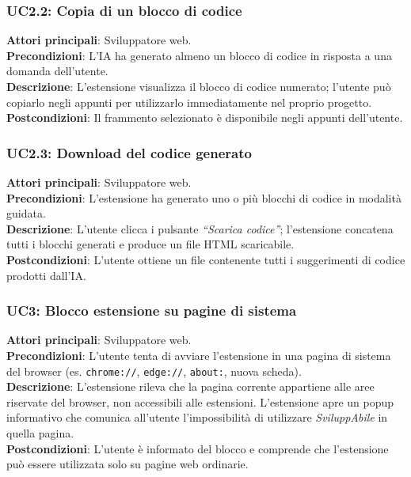 \subsubsection*{UC2.2: Copia di un blocco di codice}
\noindent \textbf{Attori principali}: Sviluppatore web.\\
\textbf{Precondizioni}: L’IA ha generato almeno un blocco di codice in risposta a una domanda dell’utente.\\
\textbf{Descrizione}: L’estensione visualizza il blocco di codice numerato; l’utente può copiarlo negli appunti per utilizzarlo immediatamente nel proprio progetto.\\
\textbf{Postcondizioni}: Il frammento selezionato è disponibile negli appunti dell’utente.\\

\subsubsection*{UC2.3: Download del codice generato}
\noindent \textbf{Attori principali}: Sviluppatore web.\\
\textbf{Precondizioni}: L’estensione ha generato uno o più blocchi di codice in modalità guidata.\\
\textbf{Descrizione}: L’utente clicca i pulsante \textit{“Scarica codice”}; l’estensione concatena tutti i blocchi generati e produce un file HTML scaricabile.\\
\textbf{Postcondizioni}: L’utente ottiene un file contenente tutti i suggerimenti di codice prodotti dall’IA.\\

\subsubsection*{UC3: Blocco estensione su pagine di sistema}
\noindent \textbf{Attori principali}: Sviluppatore web.\\
\textbf{Precondizioni}: L’utente tenta di avviare l’estensione in una pagina di sistema del browser (es. \texttt{chrome://}, \texttt{edge://}, \texttt{about:}, nuova scheda).\\
\textbf{Descrizione}: L’estensione rileva che la pagina corrente appartiene alle aree riservate del browser, non accessibili alle estensioni. L'estensione apre un popup informativo che comunica all’utente l’impossibilità di utilizzare \textit{SviluppAbile} in quella pagina.\\
\textbf{Postcondizioni}: L’utente è informato del blocco e comprende che l’estensione può essere utilizzata solo su pagine web ordinarie.\\

